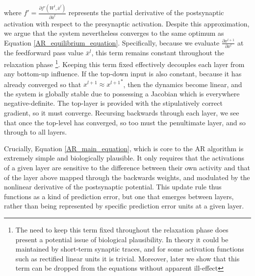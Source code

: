 where $f' = \frac{\partial f'(W^l, \bar{x}^l)}{\partial \bar{x}^l}$ represents the partial derivative of the postsynaptic activation with respect to the presynaptic activation. Despite this approximation, we argue that the system nevertheless converges to the same optimum as Equation \ref{AR_equilibrium_equation}. Specifically, because we evaluate $\frac{\partial x^{l+1}}{\partial x^l}$ at the feedforward pass value $\bar{x}^l$, this term remains constant throughout the relaxation phase \footnote{The need to keep this term fixed throughout the relaxation phase does present a potential issue of biological plausibility. In theory it could be maintained by short-term synaptic traces, and for some activation functions such as rectified linear units it is trivial. Moreover, later we show that this term can be dropped from the equations without apparent ill-effect}. Keeping this term fixed effectively decouples each layer from any bottom-up influence. If the top-down input is also constant, because it has already converged so that $x^{l+1} \approx {x^{l+1}}^*$, then the dynamics become linear, and the system is globally stable due to possessing a Jacobian which is everywhere negative-definite. The top-layer is provided with the stipulatively correct gradient, so it must converge. Recursing backwards through each layer, we see that once the top-level has converged, so too must the penultimate layer, and so through to all layers.

Crucially, Equation \ref{AR_main_equation}, which is core to the AR algorithm is extremely simple and biologically plausible. It only requires that the activations of a given layer are sensitive to the difference between their own activity and that of the layer above mapped through the backwards weights, and modulated by the nonlinear derivative of the postsynaptic potential. This update rule thus functions as a kind of prediction error, but one that emerges between layers, rather than being represented by specific prediction error units at a given layer.

